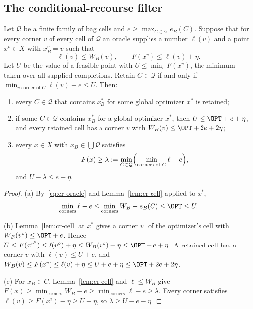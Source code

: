 \subsection{The conditional-recourse filter}\label{sec:cr-interface}

\begin{theorem}\label{thm:cr-filter}
Let $\mathcal Q$ be a finite family of bag cells and
$e\ge\max_{C\in\mathcal Q}e_B(C)$. Suppose that for every corner $v$ of
every cell of $\mathcal Q$ an oracle supplies a number $\ell(v)$ and a
point $x^v\in X$ with $x^v_B=v$ such that
\begin{equation}\label{eq:cr-oracle}
\ell(v)\le W_B(v),\qquad F(x^v)\le\ell(v)+\eta .
\end{equation}
Let $U$ be the value of a feasible point with $U\le\min_vF(x^v)$, the
minimum taken over all supplied completions. Retain $C\in\mathcal Q$ if
and only if $\min_{v\text{ corner of }C}\ell(v)-e\le U$. Then:
\begin{enumerate}
\item[(a)] every $C\in\mathcal Q$ that contains $x^*_B$ for some global
optimizer $x^*$ is retained;
\item[(b)] if some $C\in\mathcal Q$ contains $x^*_B$ for a global optimizer
$x^*$, then $U\le\OPT+e+\eta$, and every retained cell has a corner $v$
with $W_B(v)\le\OPT+2e+2\eta$;
\item[(c)] every $x\in X$ with $x_B\in\bigcup\mathcal Q$ satisfies
\[
F(x)\ge\lambda:=\min_{C\in\mathcal Q}\Bigl(\min_{\text{corners of }C}\ell-e\Bigr),
\]
and $U-\lambda\le e+\eta$.
\end{enumerate}
\end{theorem}
\begin{proof}
(a) By~\eqref{eq:cr-oracle} and Lemma~\ref{lem:cr-cell} applied to $x^*$,
\[
\min_{\text{corners}}\ell-e\le\min_{\text{corners}}W_B-e_B(C)\le\OPT\le U.
\]

(b) Lemma~\ref{lem:cr-cell} at $x^*$ gives a corner $v^\circ$ of the
optimizer's cell with $W_B(v^\circ)\le\OPT+e$. Hence
$U\le F(x^{v^\circ})\le\ell(v^\circ)+\eta\le W_B(v^\circ)+\eta\le\OPT+e+\eta$.
A retained cell has a corner $v$ with $\ell(v)\le U+e$, and
$W_B(v)\le F(x^v)\le\ell(v)+\eta\le U+e+\eta\le\OPT+2e+2\eta$.

(c) For $x_B\in C$, Lemma~\ref{lem:cr-cell} and $\ell\le W_B$ give
$F(x)\ge\min_{\text{corners}}W_B-e\ge\min_{\text{corners}}\ell-e\ge\lambda$.
Every corner satisfies $\ell(v)\ge F(x^v)-\eta\ge U-\eta$, so
$\lambda\ge U-e-\eta$.
\end{proof}

